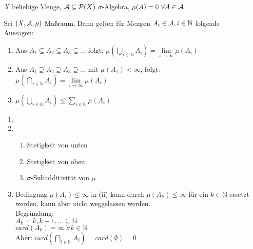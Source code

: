   \begin{example}
    $X$ beliebige Menge, $\mathcal{A} \subseteq \mathcal{P}(X)$ $\sigma$-Algebra, $\mu(A)=0 \ \forall A \in \mathcal{A}$
  \end{example}

  \begin{theorem}
    Sei $(X,\mathcal{A},\mu)$ Maßraum. Dann gelten für Mengen $A_i \in \mathcal{A}, i \in \mathbb{N}$ folgende Aussagen:

    \begin{enumerate}[label=(\roman*)]
      \item Aus $A_1 \subseteq A_2 \subseteq A_3 \subseteq ...$ folgt: $\mu (\bigcup\limits_{i \in \mathbb{N}} A_i) = \lim\limits_{i \to \infty} \mu (A_i)$
      \item Aus $A_1 \supseteq A_2 \supseteq A_3 \supseteq ...$ mit $\mu(A_1)<\infty$, folgt: $\mu (\bigcap\limits_{i \in \mathbb{N}} A_i) = \lim\limits_{i\to \infty} \mu (A_i)$
      \item $\mu(\bigcup\limits_{i\in \mathbb{N}} A_i) \leq \sum\limits_{i\in \mathbb{N}} \mu(A_i)$
    \end{enumerate}
  \end{theorem}

  \begin{remark}
    \begin{enumerate}
      \item[]
      \item \begin{enumerate}[label=(\roman*)]
        \item Stetigkeit von unten
        \item Stetigkeit von oben
        \item $\sigma$-Subadditivität von $\mu$
      \end{enumerate}
      \item Bedingung $\mu(A_i) \leq \infty$ in (ii) kann durch $\mu(A_k) \leq \infty$ für ein $k \in \mathbb{N}$ ersetzt werden, kann aber nicht weggelassen werden.\\
            Begründung:\\
            $A_k = {k, k+1,...} \subseteq \mathbb{N}$\\
            $card(A_k) = \infty \ \forall k \in \mathbb{N}$\\
            Aber: $card(\bigcap\limits_{i \in \mathbb{N}} A_i) = card(\emptyset) = 0$ 
    \end{enumerate}
  \end{remark}


